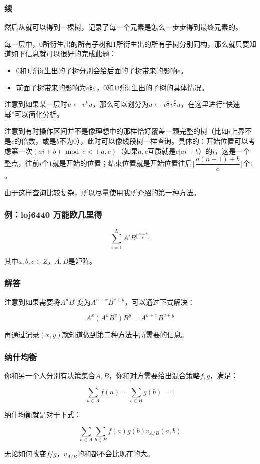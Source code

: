 \documentclass[10pt]{beamer}
\begin{document}
	\begin{frame}
		\frametitle{续}
	
		然后从就可以得到一棵树，记录了每一个元素是怎么一步步得到最终元素的。

		每一层中，$0$所衍生出的所有子树和$1$所衍生出的所有子树分别同构，那么就只要知道如下信息就可以很好的完成此题：

		\begin{itemize}
			\item $0$和$1$所衍生出的子树分别会给后面的子树带来的影响$e$。
			\item 前面子树带来的影响为$e$时，$0$和$1$所衍生出的子树的具体情况。
		\end{itemize}

		注意到如果某一层时$u\leftarrow v^ku$，那么可以划分为$u\leftarrow v^{\frac k2}v^{\frac k2}u$，在这里进行“快速幂”可以简化分析。

		注意到有时操作区间并不是像理想中的那样恰好覆盖一颗完整的树（比如$i$上界不是$c$的倍数，或是$b$不为$0$），此时可以像线段树一样查询。具体的：开始位置可以考虑第一次$(ai+b)\bmod c<(a,c)$（如果$a,c$互质就是$c|ai+b$）的$i$，这是一个整点，往前$i$个$1$就是开始的位置；结束位置就是开始位置往后$\lfloor\dfrac{a(n-1)+b}c\rfloor$个$1$。

		由于这样查询比较复杂，所以尽量使用我所介绍的第一种方法。
	
	\end{frame}
	\begin{frame}
		\frametitle{例：loj6440 万能欧几里得}
	
		$$
		\sum_{i=1}^L A^iB^{\lfloor \frac{ai+b}c\rfloor}
		$$

		其中$a,b,c\in Z$，$A,B$是矩阵。
	
	\end{frame}
	\begin{frame}
		\frametitle{解答}
	
		注意到如果需要将$A^uB^v$变为$A^{u+x}B^{v+y}$，可以通过下式解决：

		$$
		A^x(A^uB^v)B^y=A^{u+x}B^{v+y}
		$$

		再通过记录$(x,y)$就知道做到第二种方法中所需要的信息。
	
	\end{frame}
	\begin{frame}
		\frametitle{纳什均衡}
	
		你和另一个人分别有决策集合$A,B$，你和对方需要给出混合策略$f,g$，满足：

		$$
		\sum_{a\in A} f(a)=\sum_{b\in B} g(b)=1
		$$

		纳什均衡就是对于下式：

		$$
		\sum_{a\in A}\sum_{b\in B}f(a)g(b)v_{A/B}(a,b)
		$$

		无论如何改变$f/g$，$v_{A/B}$的和都不会比现在的大。
	
	\end{frame}
\end{document}
